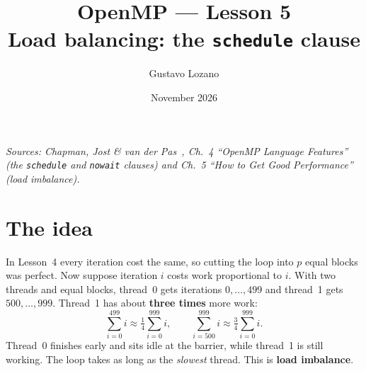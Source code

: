 \documentclass[11pt,a4paper]{article}
\title{\textbf{OpenMP --- Lesson 5}\\[4pt]\large Load balancing: the \texttt{schedule} clause}
\author{Gustavo Lozano}
\date{November 2026}
\begin{document}
\maketitle

\noindent\textit{\small Sources: Chapman, Jost \& van der Pas~\cite{chapman}, Ch.~4
``OpenMP Language Features'' (the \texttt{schedule} and \texttt{nowait} clauses) and
Ch.~5 ``How to Get Good Performance'' (load imbalance).}

\section{The idea}
In Lesson~4 every iteration cost the same, so cutting the loop into $p$ equal blocks was
perfect. Now suppose iteration $i$ costs work proportional to $i$. With two threads and
equal blocks, thread~0 gets iterations $0,\dots,499$ and thread~1 gets
$500,\dots,999$. Thread~1 has about \textbf{three times} more work:
\[
  \sum_{i=0}^{499} i \approx \tfrac14 \sum_{i=0}^{999} i,
  \qquad
  \sum_{i=500}^{999} i \approx \tfrac34 \sum_{i=0}^{999} i .
\]
Thread~0 finishes early and sits idle at the barrier, while thread~1 is still working.
The loop takes as long as the \emph{slowest} thread. This is \textbf{load imbalance}.

\begin{center}
\end{center}
\end{document}
